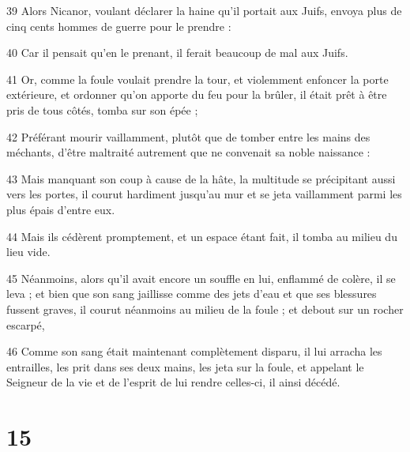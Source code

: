 \par 39 Alors Nicanor, voulant déclarer la haine qu'il portait aux Juifs, envoya plus de cinq cents hommes de guerre pour le prendre :
\par 40 Car il pensait qu'en le prenant, il ferait beaucoup de mal aux Juifs.
\par 41 Or, comme la foule voulait prendre la tour, et violemment enfoncer la porte extérieure, et ordonner qu'on apporte du feu pour la brûler, il était prêt à être pris de tous côtés, tomba sur son épée ;
\par 42 Préférant mourir vaillamment, plutôt que de tomber entre les mains des méchants, d'être maltraité autrement que ne convenait sa noble naissance :
\par 43 Mais manquant son coup à cause de la hâte, la multitude se précipitant aussi vers les portes, il courut hardiment jusqu'au mur et se jeta vaillamment parmi les plus épais d'entre eux.
\par 44 Mais ils cédèrent promptement, et un espace étant fait, il tomba au milieu du lieu vide.
\par 45 Néanmoins, alors qu'il avait encore un souffle en lui, enflammé de colère, il se leva ; et bien que son sang jaillisse comme des jets d'eau et que ses blessures fussent graves, il courut néanmoins au milieu de la foule ; et debout sur un rocher escarpé,
\par 46 Comme son sang était maintenant complètement disparu, il lui arracha les entrailles, les prit dans ses deux mains, les jeta sur la foule, et appelant le Seigneur de la vie et de l'esprit de lui rendre celles-ci, il ainsi décédé.

\chapter{15}

